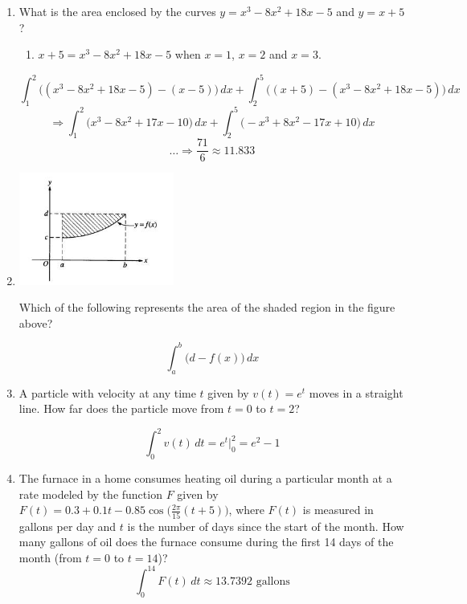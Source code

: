 \documentclass[12pt]{article}
\begin{document}
\begin{enumerate}
    \item What is the area enclosed by the curves $y=x^3-8x^2+18x-5$ and $y=x+5$?
    \begin{enumerate}
        \item $x+5=x^3-8x^2+18x-5$ when $x=1$, $x=2$ and $x=3$.
    \end{enumerate}
    $$\int_{1}^{2} \big((x^3-8x^2+18x-5)-(x-5)\big)\,dx + \int_{2}^{5} \big((x+5)-(x^3-8x^2+18x-5)\big) \,dx$$
    $$\Longrightarrow \int_{1}^{2} \big(x^3-8x^2+17x-10\big)\, dx + \int_{2}^{5} \big(-x^3+8x^2-17x+10\big)\, dx$$
    $$\dots \Longrightarrow \frac{71}{6} \approx \boxed{11.833}$$
    \item 
    \begin{center}
        \includegraphics[width=2in]{original.jpg}
    \end{center}
    Which of the following represents the area of the shaded region in the figure above?

    $$\boxed{\int_{a}^{b} \big(d-f(x)\big)\,dx}$$

    \item A particle with velocity at any time $t$ given by $v(t)=e^t$ moves in a straight line. How far does the particle move from $t=0$ to $t=2$?

    $$\int_{0}^{2} v(t) \, dt = e^t \biggr\rvert_{0}^{2} = \boxed{e^2-1}$$
\newpage
    \item The furnace in a home consumes heating oil during a particular month at a rate modeled by the function $F$ given by $F(t)=0.3+0.1t-0.85\cos\big(\frac{2\pi}{15}(t+5)\big)$, where $F(t)$ is measured in gallons per day and $t$ is the number of days since the start of the month. How many gallons of oil does the furnace consume during the first 14 days of the month (from $t=0$ to $t=14$)?
    $$\int_{0}^{14} F(t) \, dt \approx \boxed{13.7392 \text{ gallons}}$$
    

\end{enumerate}
\end{document}
